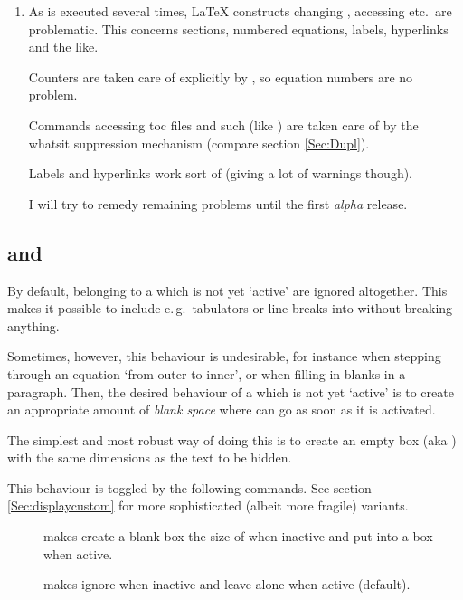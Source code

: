 \begin{slide}
\begin{enumerate}
    \newslide

  \item As  is executed several times, \LaTeX{} constructs changing , accessing
     etc.\ are problematic. This concerns sections, numbered equations, labels, hyperlinks and the like.

    Counters are taken care of explicitly by , so equation numbers are no problem.

    Commands accessing toc files and such (like ) are taken care of by the whatsit suppression
    mechanism (compare section \ref{Sec:Dupl}).

    Labels and hyperlinks work sort of (giving a lot of warnings though).

    I will try to remedy remaining problems until the first \emph{alpha} release.
  \end{enumerate}

    \newslide

  \subsection{ and }\label{Sec:boxedsteps}%
  By default,  belonging to a  which is not yet `active' are ignored altogether. This
  makes it possible to include e.\,g.\ tabulators \code{\&} or line breaks into  without breaking
  anything.

  Sometimes, however, this behaviour is undesirable, for instance when stepping through an equation `from outer to
  inner', or when filling in blanks in a paragraph. Then, the desired behaviour of a  which is not yet
  `active' is to create an appropriate amount of \emph{blank space} where  can go as soon as it is
  activated.

  \newslide

  The simplest and most robust way of doing this is to create an empty box (aka ) with the same
  dimensions as the text to be hidden.

  This behaviour is toggled by the following commands. See section \ref{Sec:displaycustom} for more sophisticated
  (albeit more fragile) variants.
  \begin{description}
  \item[] makes  create a blank box the size of  when
    inactive and put  into a box when active.
  \item[] makes  ignore  when inactive and leave
     alone when active (default).
  \end{description}


\end{slide}
